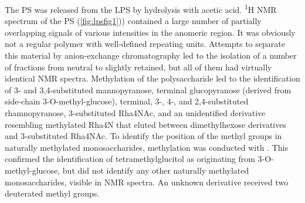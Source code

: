 		The \ac{PS} was released from the \ac{LPS} by hydrolysis with acetic acid. \textsuperscript{1}H \ac{NMR} spectrum of the \ac{PS} (\cref{fig:lpsfig1})) contained a large number of partially overlapping signals of various intensities in the anomeric region. It was obviously not a regular polymer with well-defined repeating units. Attempts to separate this material by anion-exchange chromatography led to the isolation of a number of fractions from neutral to slightly retained, but all of them had virtually identical \ac{NMR} spectra. Methylation of the polysaccharide led to the identification of 3- and 3,4-substituted mannopyranose, terminal glucopyranose (derived from side-chain 3-O-methyl-glucose), terminal, 3-, 4-, and 2,4-substituted rhamnopyranose, 3-substituted Rha4NAc, and an unidentified derivative resembling methylated Rha4N that eluted between dimethylhexose derivatives and 3-substituted Rha4NAc. To identify the position of the methyl groups in naturally methylated monosaccharides, methylation was conducted with . This confirmed the identification of tetramethylglucitol as originating from 3-O-methyl-glucose, but did not identify any other naturally methylated monosaccharides, visible in \ac{NMR} spectra. An unknown derivative received two deuterated methyl groups.

